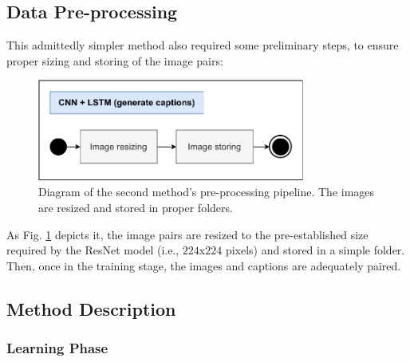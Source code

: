 \subsection{Data Pre-processing}
\label{subsec:chap3_method_b_data_preprocessing}
This admittedly simpler method also required some preliminary steps, to ensure proper sizing and storing of the image pairs:

\begin{figure}[H]
\centering
\includegraphics[width=250pt]{figures/figure_29.pdf}
\caption{Diagram of the second method's pre-processing pipeline. The images are resized and stored in proper folders.}
\label{fig:method_b_data_pre_processing_diagram}
\end{figure}

As Fig. \ref{fig:method_b_data_pre_processing_diagram} depicts it, the image pairs are resized to the pre-established size required by the ResNet model (i.e., $224$x$224$ pixels) and stored in a simple folder. Then, once in the training stage, the images and captions are adequately paired.

\subsection{Method Description}
\label{subsec:chap3_method_b_description}

\subsubsection{Learning Phase}
\label{subsec:chap3_method_b_learning_phase}

